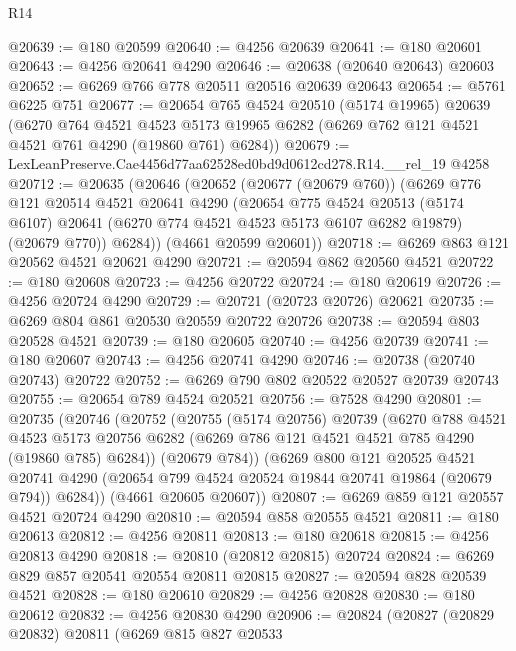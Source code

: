 \begin{lexlean}{R14}
\begin{coremodule}
@20639 := @180 @20599
@20640 := @4256 @20639
@20641 := @180 @20601
@20643 := @4256 @20641 @4290
@20646 := @20638 (@20640 @20643) @20603
@20652 := @6269 @766 @778 @20511 @20516 @20639 @20643
@20654 := @5761 @6225 @751
@20677 := @20654
    @765
    @4524
    @20510
    (@5174 @19965)
    @20639
    (@6270
      @764
      @4521
      @4523
      @5173
      @19965
      @6282
      (@6269 @762 @121 @4521 @4521 @761 @4290 (@19860 @761) @6284))
@20679 := LexLeanPreserve.Cae4456d77aa62528ed0bd9d0612cd278.R14.__rel_19 @4258
@20712 := @20635
    (@20646
      (@20652
        (@20677 (@20679 @760))
        (@6269
          @776
          @121
          @20514
          @4521
          @20641
          @4290
          (@20654
            @775
            @4524
            @20513
            (@5174 @6107)
            @20641
            (@6270 @774 @4521 @4523 @5173 @6107 @6282 @19879)
            (@20679 @770))
          @6284))
      (@4661 @20599 @20601))
@20718 := @6269 @863 @121 @20562 @4521 @20621 @4290
@20721 := @20594 @862 @20560 @4521
@20722 := @180 @20608
@20723 := @4256 @20722
@20724 := @180 @20619
@20726 := @4256 @20724 @4290
@20729 := @20721 (@20723 @20726) @20621
@20735 := @6269 @804 @861 @20530 @20559 @20722 @20726
@20738 := @20594 @803 @20528 @4521
@20739 := @180 @20605
@20740 := @4256 @20739
@20741 := @180 @20607
@20743 := @4256 @20741 @4290
@20746 := @20738 (@20740 @20743) @20722
@20752 := @6269 @790 @802 @20522 @20527 @20739 @20743
@20755 := @20654 @789 @4524 @20521
@20756 := @7528 @4290
@20801 := @20735
    (@20746
      (@20752
        (@20755
          (@5174 @20756)
          @20739
          (@6270
            @788
            @4521
            @4523
            @5173
            @20756
            @6282
            (@6269 @786 @121 @4521 @4521 @785 @4290 (@19860 @785) @6284))
          (@20679 @784))
        (@6269
          @800
          @121
          @20525
          @4521
          @20741
          @4290
          (@20654 @799 @4524 @20524 @19844 @20741 @19864 (@20679 @794))
          @6284))
      (@4661 @20605 @20607))
@20807 := @6269 @859 @121 @20557 @4521 @20724 @4290
@20810 := @20594 @858 @20555 @4521
@20811 := @180 @20613
@20812 := @4256 @20811
@20813 := @180 @20618
@20815 := @4256 @20813 @4290
@20818 := @20810 (@20812 @20815) @20724
@20824 := @6269 @829 @857 @20541 @20554 @20811 @20815
@20827 := @20594 @828 @20539 @4521
@20828 := @180 @20610
@20829 := @4256 @20828
@20830 := @180 @20612
@20832 := @4256 @20830 @4290
@20906 := @20824
    (@20827
      (@20829 @20832)
      @20811
      (@6269
        @815
        @827
        @20533

\end{coremodule}
\end{lexlean}
